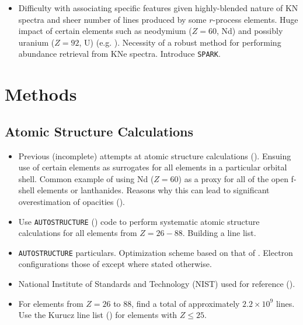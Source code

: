 \documentclass[twocolumn]{aastex63}
\begin{document}
\begin{itemize}
    \item Difficulty with associating specific features given highly-blended nature of KN spectra and sheer number of lines produced by some $r$-process elements. Huge impact of certain elements such as neodymium ($Z=60$, Nd) and possibly uranium ($Z=92$, U) (e.g. \citealt{kasen17, even19}). Necessity of a robust method for performing abundance retrieval from KNe spectra. Introduce \texttt{SPARK}.
\end{itemize}

\section{Methods}\label{sec:methods}

\subsection{Atomic Structure Calculations}\label{ssc:atomic}
\begin{itemize}

    \item Previous (incomplete) attempts at atomic structure calculations (\citealt{kasen13, tanaka18}). Ensuing use of certain elements as surrogates for all elements in a particular orbital shell. Common example of using Nd ($Z=60$) as a proxy for all of the open f-shell elements or lanthanides. Reasons why this can lead to significant overestimation of opacities (\citealt{even19}). 

    \item Use \texttt{AUTOSTRUCTURE} (\citealt{badnell16}) code to perform systematic atomic structure calculations for all elements from $Z=26-88$. Building a line list.
    
    \item \texttt{AUTOSTRUCTURE} particulars. Optimization scheme based on that of \cite{kasen13}. Electron configurations those of \cite{tanaka20} except where stated otherwise.
    
    \item National Institute of Standards and Technology (NIST) used for reference (\citealt{kramida19}).
    
    \item For elements from $Z=26$ to $88$, find a total of approximately $2.2\times10^9$ lines. Use the Kurucz line list (\citealt{kurucz95}) for elements with $Z\leqslant25$.
    
\end{itemize}
\end{document}
